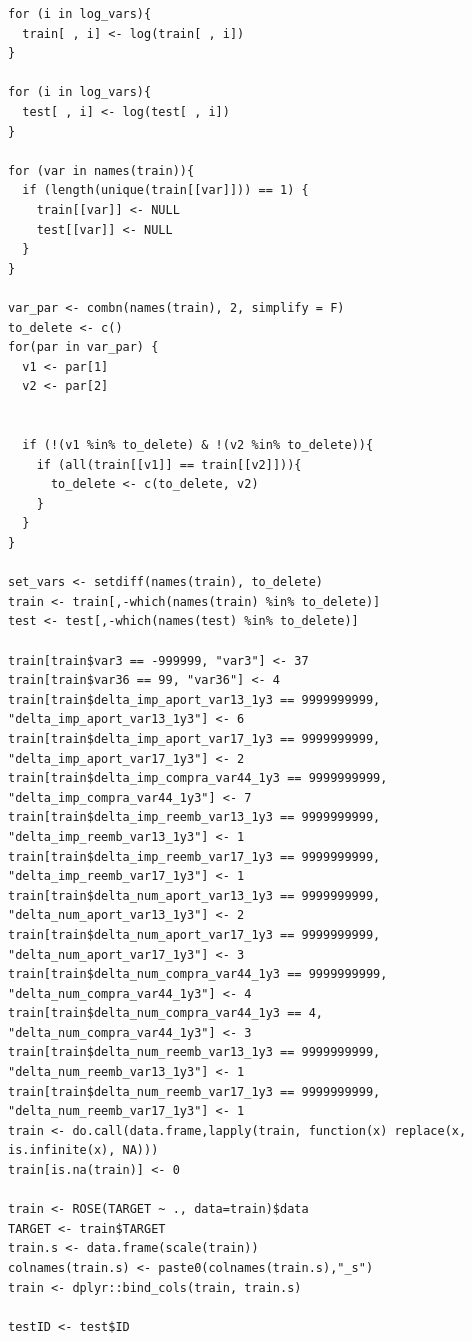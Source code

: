 \documentclass[11pt,a4paper,spanish]{article} %
\begin{document}
{\begin{verbatim}
for (i in log_vars){
  train[ , i] <- log(train[ , i])
}

for (i in log_vars){
  test[ , i] <- log(test[ , i])
}

for (var in names(train)){
  if (length(unique(train[[var]])) == 1) {
    train[[var]] <- NULL
    test[[var]] <- NULL
  }
}

var_par <- combn(names(train), 2, simplify = F)
to_delete <- c()
for(par in var_par) {
  v1 <- par[1]
  v2 <- par[2]
  
  
  if (!(v1 %in% to_delete) & !(v2 %in% to_delete)){
    if (all(train[[v1]] == train[[v2]])){
      to_delete <- c(to_delete, v2)
    }
  }
}

set_vars <- setdiff(names(train), to_delete)
train <- train[,-which(names(train) %in% to_delete)]
test <- test[,-which(names(test) %in% to_delete)]

train[train$var3 == -999999, "var3"] <- 37
train[train$var36 == 99, "var36"] <- 4
train[train$delta_imp_aport_var13_1y3 == 9999999999, "delta_imp_aport_var13_1y3"] <- 6
train[train$delta_imp_aport_var17_1y3 == 9999999999, "delta_imp_aport_var17_1y3"] <- 2
train[train$delta_imp_compra_var44_1y3 == 9999999999, "delta_imp_compra_var44_1y3"] <- 7
train[train$delta_imp_reemb_var13_1y3 == 9999999999, "delta_imp_reemb_var13_1y3"] <- 1
train[train$delta_imp_reemb_var17_1y3 == 9999999999, "delta_imp_reemb_var17_1y3"] <- 1
train[train$delta_num_aport_var13_1y3 == 9999999999, "delta_num_aport_var13_1y3"] <- 2
train[train$delta_num_aport_var17_1y3 == 9999999999, "delta_num_aport_var17_1y3"] <- 3
train[train$delta_num_compra_var44_1y3 == 9999999999, "delta_num_compra_var44_1y3"] <- 4
train[train$delta_num_compra_var44_1y3 == 4, "delta_num_compra_var44_1y3"] <- 3
train[train$delta_num_reemb_var13_1y3 == 9999999999, "delta_num_reemb_var13_1y3"] <- 1
train[train$delta_num_reemb_var17_1y3 == 9999999999, "delta_num_reemb_var17_1y3"] <- 1
train <- do.call(data.frame,lapply(train, function(x) replace(x, is.infinite(x), NA)))
train[is.na(train)] <- 0

train <- ROSE(TARGET ~ ., data=train)$data
TARGET <- train$TARGET
train.s <- data.frame(scale(train))
colnames(train.s) <- paste0(colnames(train.s),"_s")
train <- dplyr::bind_cols(train, train.s)

testID <- test$ID


\end{verbatim}}
\end{document}
